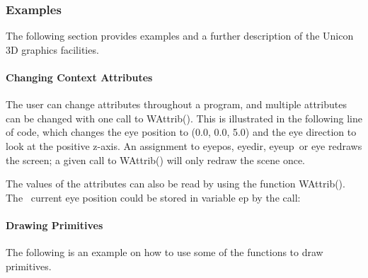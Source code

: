 \subsubsection{Examples}

The following section provides examples and a further description of the
Unicon 3D graphics facilities. 

\paragraph{Changing Context Attributes}
The user can change attributes throughout a program, and multiple
attributes can be changed with one call to WAttrib(). This is
illustrated in the following line of code, which changes the eye
position to (0.0, 0.0, 5.0) and the eye direction to look at the
positive z-axis. An assignment to eyepos, eyedir, eyeup\texttt{ }or eye
redraws the screen; a given call to WAttrib() will only redraw the
scene once.


The values of the attributes can also be read by using the function
WAttrib(). The \ current eye position could be stored in variable ep by
the call:


\paragraph{Drawing Primitives}
The following is an example on how to use some of the functions to draw
primitives. 


